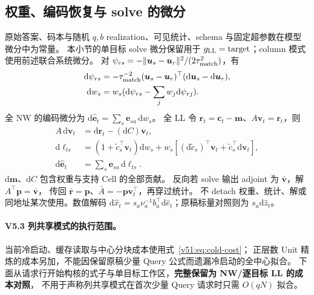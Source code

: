 \documentclass[11pt,UTF8,fontset=fandol]{ctexart}
\numberwithin{equation}{section}
\theoremstyle{definition}
\begin{document}
\subsection{权重、编码恢复与 solve 的微分}
原始答案、码本与随机 $q,b$ realization、可见统计、schema 与固定超参数在模型微分中为常量。
本小节的单目标 solve 微分保留用于 $g_{\rm LL}=\mathrm{target}$；column 模式使用前述联合系统微分。
对 $\psi_{rs}=-\|\bm u_s-\bm u_r\|^2/(2\tau_{\rm match}^2)$，有
\begin{equation}
 \begin{aligned}
 \mathrm d\psi_{rs}&=-\tau_{\rm match}^{-2}(\bm u_s-\bm u_r)^\top
                                     (\mathrm d\bm u_s-\mathrm d\bm u_r),\\
 \mathrm dw_s&=w_s(\mathrm d\psi_{rs}-\sum_jw_j\mathrm d\psi_{rj}).
 \end{aligned}
 \label{eq:T:matching-differential}
\end{equation}
全 NW 的编码微分为 $\mathrm d\widehat{\bm e}_t=\sum_s\bm e_{sa}\,\mathrm dw_s$。
全 LL 令 $\bm r_t=\bm c_t-\bm m$、$A\bm v_t=\bm r_t$，则
\begin{equation}
 \begin{aligned}
 A\,\mathrm d\bm v_t&=\mathrm d\bm r_t-(\mathrm dC)\bm v_t,\\
 \mathrm d\ell_{ts}&=(1+\widetilde c_s^\top\bm v_t)\mathrm dw_s
                  +w_s[(\mathrm d\widetilde c_s)^\top\bm v_t+\widetilde c_s^\top\mathrm d\bm v_t],\\
 \mathrm d\widehat{\bm e}_t&=\sum_s\bm e_{sa}\,\mathrm d\ell_{ts}.
 \end{aligned}
 \label{eq:T:ll-differential}
\end{equation}
$\mathrm d\bm m$、$\mathrm dC$ 包含权重与支持 Cell 的全部贡献。
反向若 solve 输出 adjoint 为 $\bar{\bm v}$，解 $A^\top\bm p=\bar{\bm v}$，
传回 $\bar{\bm r}=\bm p$、$\bar A=-\bm p\bm v_t^\top$，再穿过统计。
不 detach 权重、统计、解或同地址某次使用。数值解码
$\mathrm d\widehat x_t=s_a\nu_a^{-1}b_a^\top\mathrm d\widehat e_t$；原稿标量对照则为 $s_a\mathrm d\widehat z_t$。

\paragraph{V5.3 列共享模式的执行范围。}
当前冷启动、缓存读取与中心分块成本使用式~\eqref{v51:eq:cold-cost}；
正层数 Unit 精炼的成本另加，不能因保留原稿少量 Query 公式而遗漏冷启动的全中心拟合。
下面从请求行开始构核的式子与单目标工作区，\textbf{完整保留为 NW/逐目标 LL 的成本对照}，
不用于声称列共享模式在首次少量 Query 请求时只需 $O(qN)$ 拟合。
\end{document}

